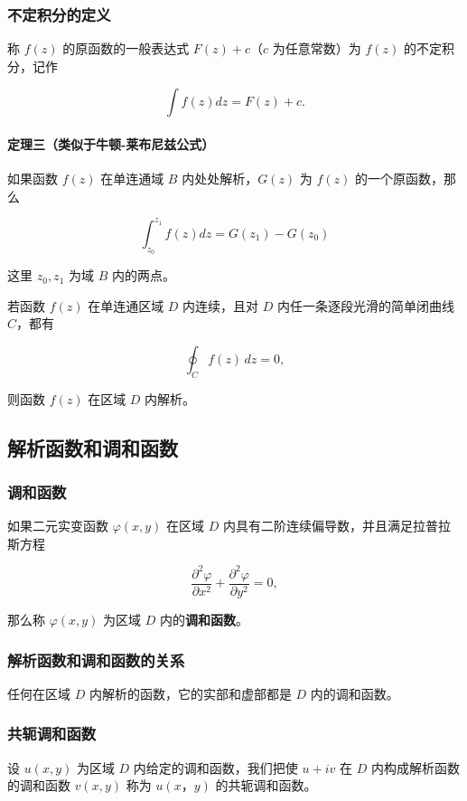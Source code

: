\subsubsection{不定积分的定义}
\label{不定积分的定义}
称 \(f(z)\) 的原函数的一般表达式 \(F(z)+c\)（\(c\) 为任意常数）为
\(f(z)\) 的不定积分，记作

\[
\int f(z)dz=F(z)+c.
\]
\paragraph{定理三（类似于牛顿-莱布尼兹公式）}
\label{定理三类似于牛顿-莱布尼兹公式}
如果函数 \(f(z)\) 在单连通域 \(B\) 内处处解析，\(G(z)\) 为 \(f(z)\)
的一个原函数，那么

\[
\int_{z_0}^{z_1} f(z)dz=G(z_1)-G(z_0)
\]

这里 \(z_0, z_1\) 为域 \(B\) 内的两点。

\begin{tcolorbox}[title={Morera 定理},colback=red!5!white
,colframe=red!75!black
,colbacktitle=yellow!50!red
,coltitle=red!25!black, fonttitle=\bfseries,subtitle style={boxrule=0.4pt, colback=yellow!50!red!25!white}]
若函数 \(f(z)\) 在单连通区域 \(D\) 内连续，且对 \(D\)
内任一条逐段光滑的简单闭曲线 \(C\)，都有

$$
\oint_C f(z) \, dz = 0,
$$

则函数 \(f(z)\) 在区域 \(D\) 内解析。

\end{tcolorbox}
\subsection{解析函数和调和函数}
\label{解析函数和调和函数}
\subsubsection{调和函数}
\label{调和函数}
如果二元实变函数 \(\varphi(x,y)\) 在区域 \(D\)
内具有二阶连续偏导数，并且满足拉普拉斯方程

\[
\frac{\partial^{2}\varphi}{\partial x^{2}} + \frac{\partial^{2}\varphi}{\partial y^{2}} = 0,
\]

那么称 \(\varphi(x,y)\) 为区域 \(D\) 内的\textbf{调和函数}。
\subsubsection{解析函数和调和函数的关系}
\label{解析函数和调和函数的关系}
任何在区域 \(D\) 内解析的函数，它的实部和虚部都是 \(D\) 内的调和函数。
\subsubsection{共轭调和函数}
\label{共轭调和函数}
设 \(u(x,y)\) 为区域 \(D\) 内给定的调和函数，我们把使 \(u+iv\) 在 \(D\)
内构成解析函数的调和函数 \(v(x,y)\) 称为 \(u(x，y)\) 的共轭调和函数。

